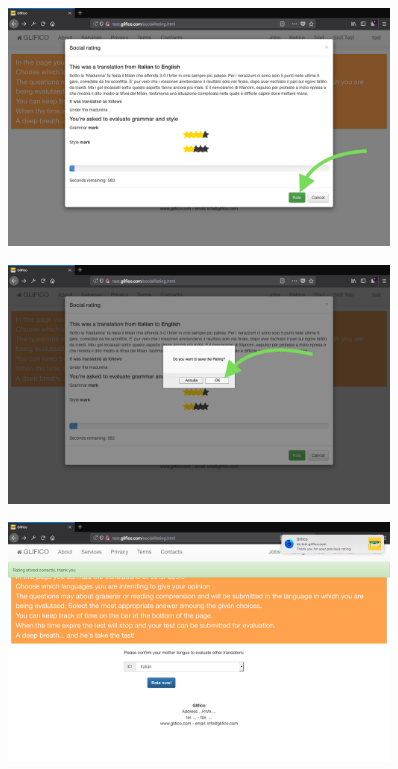 \documentclass[11 pt, a4paper]{article}
\begin{document}
\clearpage
\begin{figure}[H]
\centering
\includegraphics[width=0.9\textwidth]{translator_socialrating6.png}
\end{figure}


\begin{figure}[H]
\centering
\includegraphics[width=0.9\textwidth]{translator_socialrating7.png}
\end{figure}


\clearpage
\begin{figure}[H]
\centering
\includegraphics[width=0.9\textwidth]{translator_socialrating8.png}
\end{figure}
\end{document}
